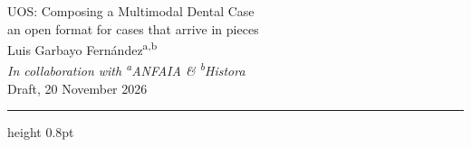 \documentclass[11pt,a4paper]{article}
\begin{document}
\begin{center}
{\LARGE UOS: Composing a Multimodal Dental Case}\\[0.30cm]
{\large an open format for cases that arrive in pieces}\\[0.9cm]
{\large Luis Garbayo Fernández\textsuperscript{a,b}}\\[0.5cm]
{\small\itshape In collaboration with \textsuperscript{a}ANFAIA \& \textsuperscript{b}Histora}\\[0.3cm]
{\small Draft, 20 November 2026}
\end{center}

\vspace{0.6cm}
\hrule height 0.8pt
\vspace{0.35cm}

\vspace{0.15cm}
\end{document}
